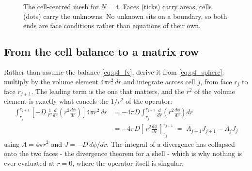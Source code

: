 \documentclass[11pt]{article}
\begin{document}
{\begin{figure}[htbp]
\centering
{}
\caption{The cell-centred mesh for $N = 4$. Faces (ticks) carry areas, cells (dots) carry the unknowns. No unknown sits on a boundary, so both ends are face conditions rather than equations of their own.}
\label{fig:mesh}
\end{figure}

\subsection*{From the cell balance to a matrix row}

Rather than assume the balance \eqref{eq:q4_fv}, derive it from \eqref{eq:q4_sphere}: multiply by the volume element $4\pi r^2\,dr$ and integrate across cell $j$, from face $r_j$ to face $r_{j+1}$. The leading term is the one that matters, and the $r^2$ of the volume element is exactly what cancels the $1/r^2$ of the operator:
\begin{equation}
\begin{aligned}
    \int_{r_j}^{r_{j+1}} \left[-D\,\frac{1}{r^2}\frac{d}{dr}\!\left(r^2 \frac{d\phi}{dr}\right)\right] 4\pi r^2\,dr
    &= -4\pi D \int_{r_j}^{r_{j+1}} \frac{d}{dr}\!\left(r^2 \frac{d\phi}{dr}\right) dr \\[2pt]
    &= -4\pi D \left[\, r^2 \frac{d\phi}{dr} \,\right]_{r_j}^{r_{j+1}}
     \;=\; A_{j+1} J_{j+1} - A_j J_j
\end{aligned}
\label{eq:fv_derivation}
\end{equation}
using $A = 4\pi r^2$ and $J = -D\,d\phi/dr$. The integral of a divergence has collapsed onto the two faces - the divergence theorem for a shell - which is why nothing is ever evaluated at $r = 0$, where the operator itself is singular.

}
\end{document}
